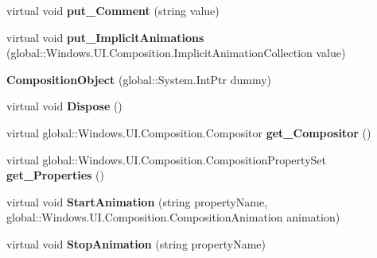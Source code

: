 \begin{DoxyCompactItemize}
virtual void {\bfseries put\+\_\+\+Comment} (string value)
\item 
\mbox{\label{class_windows_1_1_u_i_1_1_composition_1_1_composition_object_ad8d4008a5c31ce42878ce448fe3e5598}} 
virtual void {\bfseries put\+\_\+\+Implicit\+Animations} (global\+::\+Windows.\+U\+I.\+Composition.\+Implicit\+Animation\+Collection value)
\item 
\mbox{\label{class_windows_1_1_u_i_1_1_composition_1_1_composition_object_a31b74b02386afece7eb73f6d8009fdea}} 
{\bfseries Composition\+Object} (global\+::\+System.\+Int\+Ptr dummy)
\item 
\mbox{\label{class_windows_1_1_u_i_1_1_composition_1_1_composition_object_a443e6ebcc8d54382c90b7a6309ef1b1f}} 
virtual void {\bfseries Dispose} ()
\item 
\mbox{\label{class_windows_1_1_u_i_1_1_composition_1_1_composition_object_a02238179cbd70c9e4a518009d12e39e7}} 
virtual global\+::\+Windows.\+U\+I.\+Composition.\+Compositor {\bfseries get\+\_\+\+Compositor} ()
\item 
\mbox{\label{class_windows_1_1_u_i_1_1_composition_1_1_composition_object_a365892d3180752a586915b7673ffda82}} 
virtual global\+::\+Windows.\+U\+I.\+Composition.\+Composition\+Property\+Set {\bfseries get\+\_\+\+Properties} ()
\item 
\mbox{\label{class_windows_1_1_u_i_1_1_composition_1_1_composition_object_af5a951dd44f067e4376daa62bcd893a1}} 
virtual void {\bfseries Start\+Animation} (string property\+Name, global\+::\+Windows.\+U\+I.\+Composition.\+Composition\+Animation animation)
\item 
\mbox{\label{class_windows_1_1_u_i_1_1_composition_1_1_composition_object_a1cd6b40941abd315607a06f492a8bc8f}} 
virtual void {\bfseries Stop\+Animation} (string property\+Name)
\item 

\end{DoxyCompactItemize}
